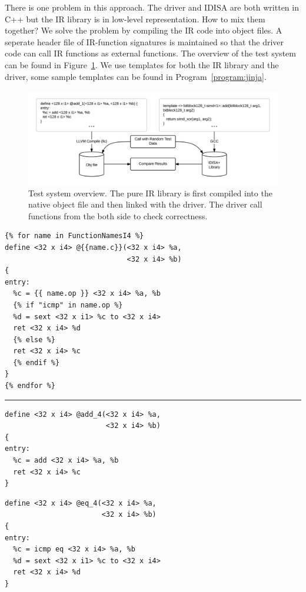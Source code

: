 There is one problem in this approach. The driver and IDISA are both written in C++ but the IR library is in low-level representation. How to mix them together? We solve the problem by compiling the IR code into object files. A seperate header file of IR-function signatures is maintained so that the driver code can call IR functions as external functions. The overview of the test system can be found in Figure~\ref{figure:test}. We use templates for both the IR library and the driver, some sample templates can be found in Program~\ref{program:jinja}.


\begin{figure}[hbpt!]
\centering
\includegraphics[width=140mm]{draw/test.png}
\caption[Test system overview.]{Test system overview. The pure IR library is first compiled into the native object file and then linked with the driver. The driver call functions from the both side to check correctness.}
\label{figure:test}
\end{figure}

\begin{program}
\begin{verbatim}
{% for name in FunctionNamesI4 %}
define <32 x i4> @{{name.c}}(<32 x i4> %a,
                             <32 x i4> %b)
{
entry:
  %c = {{ name.op }} <32 x i4> %a, %b
  {% if "icmp" in name.op %}
  %d = sext <32 x i1> %c to <32 x i4>
  ret <32 x i4> %d
  {% else %}
  ret <32 x i4> %c
  {% endif %}
}
{% endfor %}
\end{verbatim}
\rule{\textwidth}{1pt}

\begin{multicols}{2}
\begin{verbatim}
define <32 x i4> @add_4(<32 x i4> %a,
                        <32 x i4> %b)
{
entry:
  %c = add <32 x i4> %a, %b
  ret <32 x i4> %c
}
\end{verbatim}
\columnbreak
\begin{verbatim}
define <32 x i4> @eq_4(<32 x i4> %a,
                       <32 x i4> %b)
{
entry:
  %c = icmp eq <32 x i4> %a, %b
  %d = sext <32 x i1> %c to <32 x i4>
  ret <32 x i4> %d
}
\end{verbatim}
\end{multicols}
\caption[Templates for the IR Libray]{Templates for the IR Library. On the top is the template, and two different output are listed below. We use embedded for loop and if statements.}
\label{program:jinja}
\end{program}
